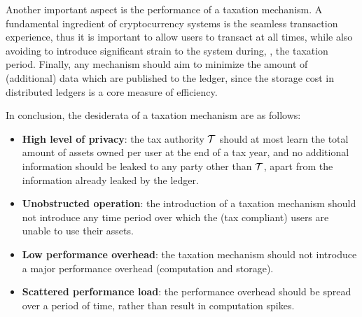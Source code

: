 Another important aspect is the performance of a taxation mechanism.  A
fundamental ingredient of cryptocurrency systems is the seamless transaction
experience, thus it is important to allow users to transact at all times, while
also avoiding to introduce significant strain to the system during, \eg, the
taxation period. Finally, any mechanism should aim to minimize the amount of
(additional) data which are published to the ledger, since the storage cost in
distributed ledgers is a core measure of efficiency.

In conclusion, the desiderata of a taxation mechanism are as follows:
\begin{itemize}
    \item \textbf{High level of privacy}: the tax authority $\mathcal{T}$ should
        at most learn the total amount of assets owned per user at the end of a
        tax year, and no additional information should be leaked to any party
        other than $\mathcal{T}$, apart from the information already leaked by
        the ledger.
    \item \textbf{Unobstructed operation}: the introduction of a taxation
        mechanism should not introduce any time period over which the (tax
        compliant) users are unable to use their assets.
    \item \textbf{Low performance overhead}: the taxation mechanism should not
        introduce a major performance overhead (\ie computation and storage).
    \item \textbf{Scattered performance load}: the performance overhead should
        be spread over a period of time, rather than result in computation
        spikes.
\end{itemize}
